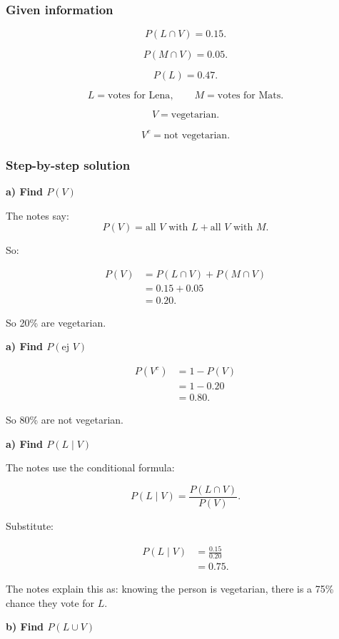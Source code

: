 \documentclass[10pt]{article}
\begin{document}
\subsubsection*{Given information}
\[
P(L\cap V)=0.15.
\]

\[
P(M\cap V)=0.05.
\]

\[
P(L)=0.47.
\]

\[
L=\text{votes for Lena},
\qquad
M=\text{votes for Mats}.
\]

\[
V=\text{vegetarian}.
\]

\[
V^c=\text{not vegetarian}.
\]

\subsubsection*{Step-by-step solution}

\textbf{a) Find \(P(V)\)}

The notes say:
\[
P(V)
=
\text{all }V\text{ with }L
+
\text{all }V\text{ with }M.
\]

So:

\begin{align*}
P(V)
&=P(L\cap V)+P(M\cap V) \\[2mm]
&=0.15+0.05 \\[2mm]
&=0.20.
\end{align*}

So 20\% are vegetarian.

\textbf{a) Find \(P(\text{ej }V)\)}

\begin{align*}
P(V^c)
&=1-P(V) \\[2mm]
&=1-0.20 \\[2mm]
&=0.80.
\end{align*}

So 80\% are not vegetarian.

\textbf{a) Find \(P(L\mid V)\)}

The notes use the conditional formula:

\[
P(L\mid V)
=
\frac{P(L\cap V)}{P(V)}.
\]

Substitute:

\begin{align*}
P(L\mid V)
&=
\frac{0.15}{0.20} \\[2mm]
&=0.75.
\end{align*}

The notes explain this as:
knowing the person is vegetarian,
there is a 75\% chance they vote for \(L\).

\textbf{b) Find \(P(L\cup V)\)}
\end{document}
